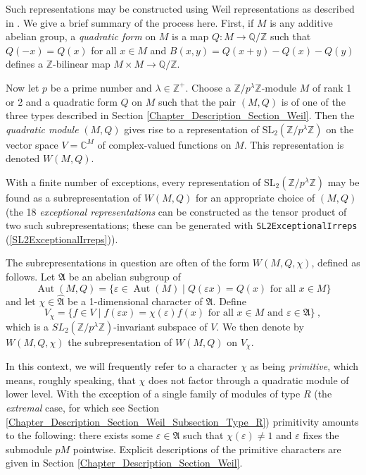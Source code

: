 \documentclass[a4paper,11pt]{report}
\begin{document}
{{ Such representations may be constructed using Weil representations as
described in \cite[Section 1]{Nobs1}. We give a brief summary of the process here. First, if $M$ is any additive abelian group, a \emph{quadratic form} on $M$ is a map $Q : M \to \mathbb{Q}/\mathbb{Z}$ such that $Q(-x) = Q(x)$ for all $x \in M$ and $B(x,y) = Q(x+y) - Q(x) - Q(y)$ defines a $\mathbb{Z}$-bilinear map $M \times M \to \mathbb{Q}/\mathbb{Z}$. 

 Now let $p$ be a prime number and $\lambda \in \mathbb{Z}^+$. Choose a $\mathbb{Z}/p^\lambda\mathbb{Z}$-module $M$ of rank 1 or 2 and a quadratic form $Q$ on $M$ such that the pair $(M,Q)$ is of one of the three types described in Section \ref{Chapter_Description_Section_Weil}. Then the \emph{quadratic module} $(M,Q)$ gives rise to a representation of $\mathrm{SL}_2(\mathbb{Z}/p^\lambda\mathbb{Z})$ on the vector space $V = \mathbb{C}^M$ of complex-valued functions on $M$. This representation is denoted $W(M,Q)$. 

 With a finite number of exceptions, every representation of $\mathrm{SL}_2(\mathbb{Z}/p^\lambda\mathbb{Z})$ may be found as a subrepresentation of $W(M,Q)$ for an appropriate choice of $(M,Q)$ \cite[Hauptsatz 2]{NW76} (the 18 \emph{exceptional representations} can be constructed as the tensor product of two such subrepresentations; these
can be generated with \texttt{SL2ExceptionalIrreps} (\ref{SL2ExceptionalIrreps})).

 The subrepresentations in question are often of the form $W(M,Q,\chi)$, defined as follows. Let $\mathfrak{A}$ be an abelian subgroup of 
\[\operatorname{Aut}(M,Q) = \{ \varepsilon \in \operatorname{Aut}(M) \mid
Q(\varepsilon x) = Q(x) \text{ for all } x \in M\}\]
 and let $\chi \in \widehat{\mathfrak{A}}$ be a 1-dimensional character of $\mathfrak{A}$. Define 
\[V_\chi = \{f \in V \mid f(\varepsilon x) = \chi(\varepsilon) f(x) \text{ for
all } x \in M \text{ and } \varepsilon \in \mathfrak{A}\}~,\]
 which is a $SL_2(\mathbb{Z}/p^\lambda\mathbb{Z})$-invariant subspace of $V$. We then denote by $W(M,Q,\chi)$ the subrepresentation of $W(M,Q)$ on $V_\chi$. 

 In this context, we will frequently refer to a character $\chi$ as being \emph{primitive}, which means, roughly speaking, that $\chi$ does not factor through a quadratic module of lower level. With the exception
of a single family of modules of type $R$ (the \emph{extremal} case, for which see Section \ref{Chapter_Description_Section_Weil_Subsection_Type_R}) primitivity amounts to the following: there exists some $\varepsilon \in \mathfrak{A}$ such that $\chi(\varepsilon) \neq 1$ and $\varepsilon$ fixes the submodule $pM$ pointwise. Explicit descriptions of the primitive characters are given in
Section \ref{Chapter_Description_Section_Weil}.

}}
\end{document}
